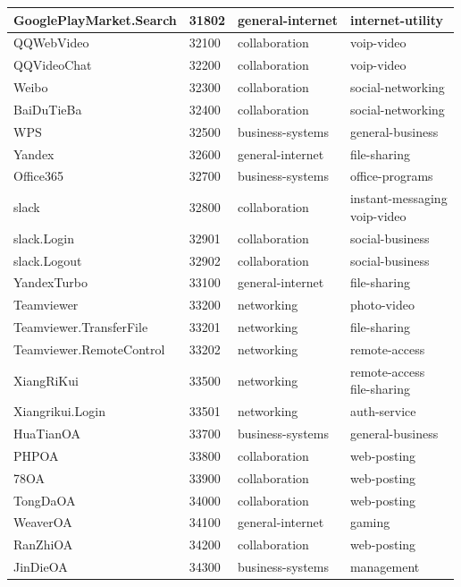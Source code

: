 \begin{longtable}{p{}|p{}|p{}|p{}}
    GooglePlayMarket.Search &	31802 &	general-internet &	internet-utility \\ \hline
    QQWebVideo &	32100 &	collaboration &	voip-video \\ \hline
    QQVideoChat &	32200 &	collaboration &	voip-video \\ \hline
    Weibo &	32300 &	collaboration &	social-networking \\ \hline
    BaiDuTieBa &	32400 &	collaboration &	social-networking \\ \hline
    WPS &	32500 &	business-systems &	general-business \\ \hline
    Yandex &	32600 &	general-internet &	file-sharing \\ \hline
    Office365 &	32700 &	business-systems &	office-programs \\ \hline
    slack &	32800 &	collaboration &	\tabincell{l}{instant-messaging\\ voip-video} \\ \hline
    slack.Login &	32901 &	collaboration &	social-business \\ \hline
    slack.Logout &	32902 &	collaboration &	social-business \\ \hline
    YandexTurbo &	33100 &	general-internet &	file-sharing \\ \hline
    Teamviewer &	33200 &	networking &	photo-video \\ \hline
    Teamviewer.TransferFile &	33201 &	networking &	file-sharing \\ \hline
    Teamviewer.RemoteControl &	33202 &	networking &	remote-access \\ \hline
    XiangRiKui &	33500 &	networking & \tabincell{l}{remote-access\\ file-sharing} \\ \hline
    Xiangrikui.Login &	33501 &	networking &	auth-service \\ \hline
    HuaTianOA &	33700 &	business-systems &	general-business \\ \hline
    PHPOA &	33800 &	collaboration &	web-posting \\ \hline
    78OA &	33900 &	collaboration &	web-posting \\ \hline
    TongDaOA &	34000 &	collaboration &	web-posting \\ \hline
    WeaverOA &	34100 &	general-internet &	gaming \\ \hline
    RanZhiOA &	34200 &	collaboration &	web-posting \\ \hline
    JinDieOA &	34300 &	business-systems &	management \\ \hline

\end{longtable}

